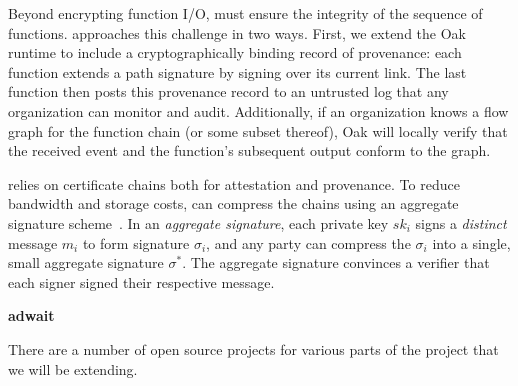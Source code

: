 %
Beyond encrypting function I/O, \SystemName must ensure the integrity
of the sequence of functions.
%
%
\SystemName approaches this challenge in two ways.
%
First, we extend the Oak runtime to include a cryptographically binding record
of provenance: each function extends a path signature by signing over its
current link.
%
The last function then posts this provenance record to an untrusted log that
any organization can monitor and audit.
%
Additionally, if an organization knows a flow graph for the function chain (or
some subset thereof),  Oak will locally verify that the received event and the
function's subsequent output conform to the graph.


%
\SystemName relies on certificate chains both for attestation and provenance.
%
To reduce bandwidth and storage costs, \SystemName can compress the chains
using an aggregate signature
scheme~\cite{03-eurocrypt-aggregate_signatures_bilinear_maps}.
%
In an \emph{aggregate signature},
each private key $sk_i$ signs a \emph{distinct} message $m_i$ to form signature
$\sigma_i$, and any party can compress the $\sigma_i$ into a single,
small aggregate signature $\sigma^*$.  
%
The aggregate signature convinces a verifier that each signer signed their
respective message.


\textbf{adwait}

There are a number of open source projects for various parts of the project that we will be extending.

